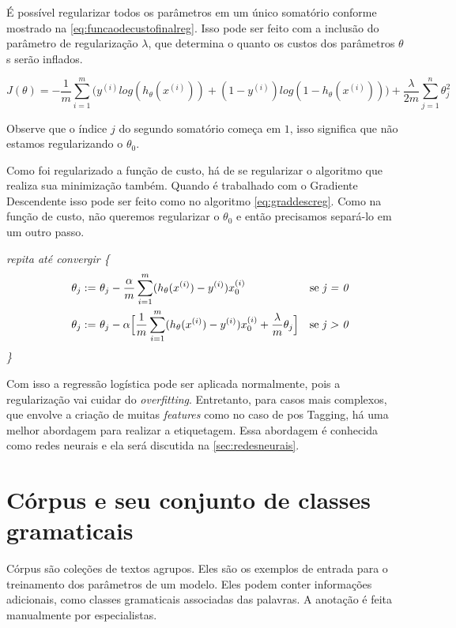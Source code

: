 É possível regularizar todos os parâmetros em um único somatório conforme mostrado na \autoref{eq:funcaodecustofinalreg}. Isso pode ser feito com a inclusão do parâmetro de regularização $\lambda$, que determina o quanto os custos dos parâmetros $\theta$s serão inflados.

\begin{equation} \label{eq:funcaodecustofinalreg}
J(\theta) = - \frac{1}{m}\sum\limits_{i=1}^{m}\Big( y^{(i)}log(h_{\theta}(x^{(i)})) + (1-y^{(i)})log(1 - h_{\theta}(x^{(i)})) \Big)
+ \frac{\lambda}{2m}\sum\limits_{j=1}^{n} \theta_j^2
\end{equation}

Observe que o índice $j$ do segundo somatório começa em $1$, isso significa que não estamos regularizando o $\theta_0$.

Como foi regularizado a função de custo, há de se regularizar o algoritmo que realiza sua minimização também. Quando é trabalhado com o Gradiente Descendente isso pode ser feito como no algoritmo \ref{eq:graddescreg}. Como na função de custo, não queremos regularizar o $\theta_0$ e então precisamos separá-lo em um outro passo.

\textit{repita até convergir \{}
\begin{align} 
\quad \theta_j := &\ \theta_j - \frac{\alpha}{m} \sum\limits_{i=1}^{m}(h_{\theta}(x^{(i)}) - y^{(i)}) x_0^{(i)} & \text{se \textit{j = 0}} \nonumber \\
\quad \theta_j := &\ \theta_j - \alpha \Big[ \frac{1}{m} \sum\limits_{i=1}^{m} (h_{\theta}(x^{(i)}) - y^{(i)}) x_0^{(i)} + \frac{\lambda}{m}\theta_j \Big] & \text{se \textit{j > 0}} \label{eq:graddescreg}
\end{align}
\textit{\quad\quad\quad \}}

Com isso a regressão logística pode ser aplicada normalmente, pois a regularização vai cuidar do \textit{overfitting}. Entretanto, para casos mais complexos, que envolve a criação de muitas \textit{features} como no caso de \ac{pos} Tagging, há uma melhor abordagem para realizar a etiquetagem. Essa abordagem é conhecida como redes neurais e ela será discutida na \autoref{sec:redesneurais}.


\section{Córpus e seu conjunto de classes gramaticais}

Córpus são coleções de textos agrupos. Eles são os exemplos de entrada para o treinamento dos parâmetros de um modelo. Eles podem conter informações adicionais, como classes gramaticais associadas das palavras. A anotação é feita manualmente por especialistas.


